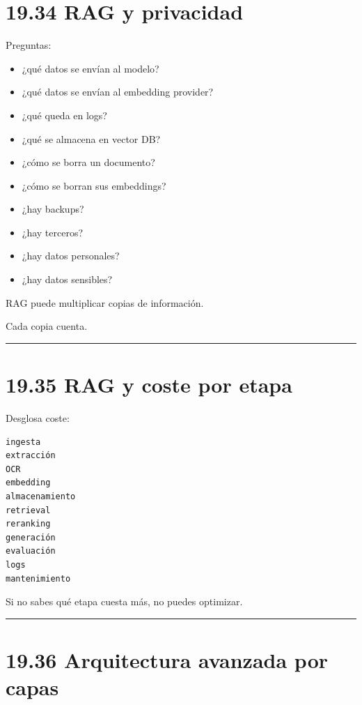 \section{19.34 RAG y privacidad}\label{rag-y-privacidad}

Preguntas:

\begin{itemize}
\tightlist
\item
  ¿qué datos se envían al modelo?
\item
  ¿qué datos se envían al embedding provider?
\item
  ¿qué queda en logs?
\item
  ¿qué se almacena en vector DB?
\item
  ¿cómo se borra un documento?
\item
  ¿cómo se borran sus embeddings?
\item
  ¿hay backups?
\item
  ¿hay terceros?
\item
  ¿hay datos personales?
\item
  ¿hay datos sensibles?
\end{itemize}

RAG puede multiplicar copias de información.

Cada copia cuenta.

\begin{center}\rule{0.5\linewidth}{0.5pt}\end{center}

\section{19.35 RAG y coste por etapa}\label{rag-y-coste-por-etapa}

Desglosa coste:

\begin{lstlisting}
ingesta
extracción
OCR
embedding
almacenamiento
retrieval
reranking
generación
evaluación
logs
mantenimiento
\end{lstlisting}

Si no sabes qué etapa cuesta más, no puedes optimizar.

\begin{center}\rule{0.5\linewidth}{0.5pt}\end{center}

\section{19.36 Arquitectura avanzada por
capas}\label{arquitectura-avanzada-por-capas}


